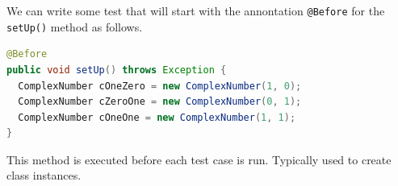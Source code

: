 \documentclass[11pt, xcolor=svgnames]{beamer}
\begin{document}

%
%
%
%
%
%

% 


%


\begin{frame}[fragile]

We can write some test that will start with the annontation \texttt{@Before} for the \texttt{setUp()} method as follows.

\begin{lstlisting}[language=Java,basicstyle=\tiny]
@Before
public void setUp() throws Exception {
  ComplexNumber cOneZero = new ComplexNumber(1, 0);
  ComplexNumber cZeroOne = new ComplexNumber(0, 1);
  ComplexNumber cOneOne = new ComplexNumber(1, 1);
}
\end{lstlisting}	
This method is executed before each test case is run. Typically used to create class instances.
\end{frame}
\end{document}
